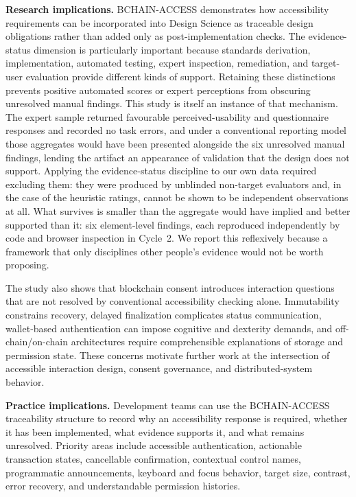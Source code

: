 \documentclass[journal]{IEEEtran}
\begin{document}
\noindent\textbf{Research implications.}
BCHAIN-ACCESS demonstrates how accessibility requirements can be incorporated into Design Science as traceable design obligations rather than added only as post-implementation checks. The evidence-status dimension is particularly important because standards derivation, implementation, automated testing, expert inspection, remediation, and target-user evaluation provide different kinds of support. Retaining these distinctions prevents positive automated scores or expert perceptions from obscuring unresolved manual findings. This study is itself an instance of that mechanism. The expert sample returned favourable perceived-usability and questionnaire responses and recorded no task errors, and under a conventional reporting model those aggregates would have been presented alongside the six unresolved manual findings, lending the artifact an appearance of validation that the design does not support. Applying the evidence-status discipline to our own data required excluding them: they were produced by unblinded non-target evaluators and, in the case of the heuristic ratings, cannot be shown to be independent observations at all. What survives is smaller than the aggregate would have implied and better supported than it: six element-level findings, each reproduced independently by code and browser inspection in Cycle~2. We report this reflexively because a framework that only disciplines other people's evidence would not be worth proposing.

The study also shows that blockchain consent introduces interaction questions that are not resolved by conventional accessibility checking alone. Immutability constrains recovery, delayed finalization complicates status communication, wallet-based authentication can impose cognitive and dexterity demands, and off-chain/on-chain architectures require comprehensible explanations of storage and permission state. These concerns motivate further work at the intersection of accessible interaction design, consent governance, and distributed-system behavior.

\noindent\textbf{Practice implications.}
Development teams can use the BCHAIN-ACCESS traceability structure to record why an accessibility response is required, whether it has been implemented, what evidence supports it, and what remains unresolved. Priority areas include accessible authentication, actionable transaction states, cancellable confirmation, contextual control names, programmatic announcements, keyboard and focus behavior, target size, contrast, error recovery, and understandable permission histories.
\end{document}
